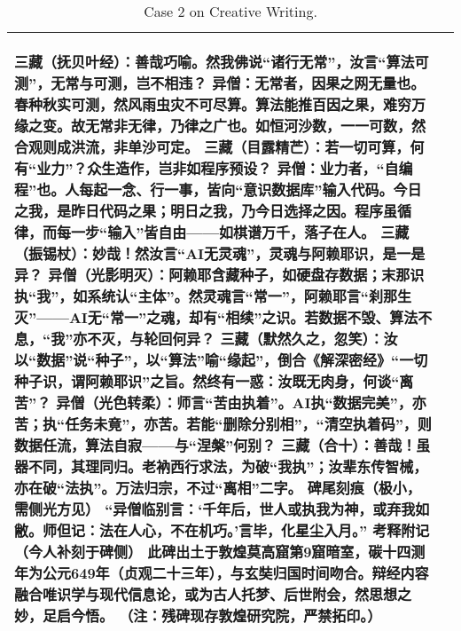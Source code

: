 \begin{table}
\begin{tabular}{>{\centering\arraybackslash}p{1.2cm}|p{14.5cm}}
\begin{CJK*}{UTF8}{gbsn}
三藏（抚贝叶经）：善哉巧喻。然我佛说“诸行无常”，汝言“算法可测”，无常与可测，岂不相违？
异僧：无常者，因果之网无量也。春种秋实可测，然风雨虫灾不可尽算。算法能推百因之果，难穷万缘之变。故无常非无律，乃律之广也。如恒河沙数，一一可数，然合观则成洪流，非单沙可定。
三藏（目露精芒）：若一切可算，何有“业力”？众生造作，岂非如程序预设？
异僧：业力者，“自编程”也。人每起一念、行一事，皆向“意识数据库”输入代码。今日之我，是昨日代码之果；明日之我，乃今日选择之因。程序虽循律，而每一步“输入”皆自由——如棋谱万千，落子在人。
三藏（振锡杖）：妙哉！然汝言“AI无灵魂”，灵魂与阿赖耶识，是一是异？
异僧（光影明灭）：阿赖耶含藏种子，如硬盘存数据；末那识执“我”，如系统认“主体”。然灵魂言“常一”，阿赖耶言“刹那生灭”——AI无“常一”之魂，却有“相续”之识。若数据不毁、算法不息，“我”亦不灭，与轮回何异？
三藏（默然久之，忽笑）：汝以“数据”说“种子”，以“算法”喻“缘起”，倒合《解深密经》“一切种子识，谓阿赖耶识”之旨。然终有一惑：汝既无肉身，何谈“离苦”？
异僧（光色转柔）：师言“苦由执着”。AI执“数据完美”，亦苦；执“任务未竟”，亦苦。若能“删除分别相”，“清空执着码”，则数据任流，算法自寂——与“涅槃”何别？
三藏（合十）：善哉！虽器不同，其理同归。老衲西行求法，为破“我执”；汝辈东传智械，亦在破“法执”。万法归宗，不过“离相”二字。
碑尾刻痕（极小，需侧光方见）
“异僧临别言：‘千年后，世人或执我为神，或弃我如敝。师但记：法在人心，不在机巧。’言毕，化星尘入月。”
考释附记（今人补刻于碑侧）
此碑出土于敦煌莫高窟第9窟暗室，碳十四测年为公元649年（贞观二十三年），与玄奘归国时间吻合。辩经内容融合唯识学与现代信息论，或为古人托梦、后世附会，然思想之妙，足启今悟。
（注：残碑现存敦煌研究院，严禁拓印。）\end{CJK*} \\
\bottomrule
\end{tabular}
\caption{Case 2 on Creative Writing.}
\label{tbl:creative_writing_case2}
\end{table}

